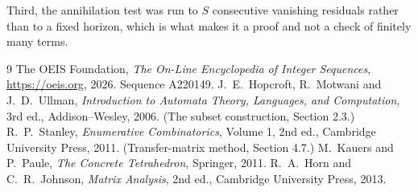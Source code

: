 \documentclass[11pt,a4paper]{article}
\theoremstyle{plain}
\theoremstyle{definition}
\begin{document}
Third, the annihilation test was run to $S$ consecutive vanishing residuals rather than to a
fixed horizon, which is what makes it a proof and not a check of finitely many terms.

\begin{thebibliography}{9}
 The OEIS Foundation, \emph{The On-Line Encyclopedia of Integer
Sequences}, \url{https://oeis.org}, 2026. Sequence A220149.
 J.~E.~Hopcroft, R.~Motwani and J.~D.~Ullman, \emph{Introduction to Automata
Theory, Languages, and Computation}, 3rd ed., Addison--Wesley, 2006. (The subset
construction, Section 2.3.)
 R.~P.~Stanley, \emph{Enumerative Combinatorics}, Volume 1, 2nd ed.,
Cambridge University Press, 2011. (Transfer-matrix method, Section 4.7.)
 M.~Kauers and P.~Paule, \emph{The Concrete Tetrahedron}, Springer, 2011.
 R.~A.~Horn and C.~R.~Johnson, \emph{Matrix Analysis}, 2nd ed., Cambridge
University Press, 2013.
\end{thebibliography}
\end{document}

